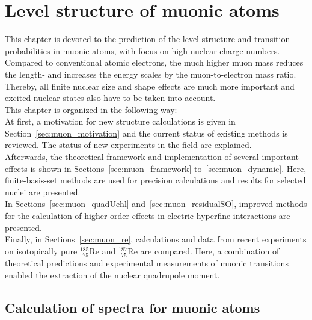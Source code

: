 \chapter{Level structure of muonic atoms}
\label{ch:muonic_atoms}
This chapter is devoted to the prediction of the level structure and transition probabilities in muonic atoms, with focus on high nuclear charge numbers. Compared to conventional atomic electrons, the much higher muon mass reduces the length- and  increases the energy scales by the muon-to-electron mass ratio. Thereby, all finite nuclear size and shape effects are much more important and excited nuclear states also have to be taken into account.\\
This chapter is organized in the following way:\\
At first, a motivation for new structure calculations is given in Section~\ref{sec:muon_motivation} and the current status of existing methods is reviewed. The status of new experiments in the field are explained.\\
Afterwards, the theoretical framework and implementation of several important effects is shown in Sections~\ref{sec:muon_framework} to~\ref{sec:muon_dynamic}. Here, finite-basis-set methods are used for precision calculations and results for selected nuclei are presented.\\
In Sections~\ref{sec:muon_quadUehl} and~\ref{sec:muon_residualSO}, improved methods for the calculation of higher-order effects in electric hyperfine interactions are presented.\\
Finally, in Sections~\ref{sec:muon_re}, calculations and data from recent experiments on isotopically pure $^{185}_{\;\,75}$Re and $^{187}_{\;\,75}$Re are compared. Here, a combination of theoretical predictions and experimental measurements of muonic transitions enabled the extraction of the nuclear quadrupole moment.

\section{Calculation of spectra for muonic atoms}
\label{sec:calculationSpectraMuon}
